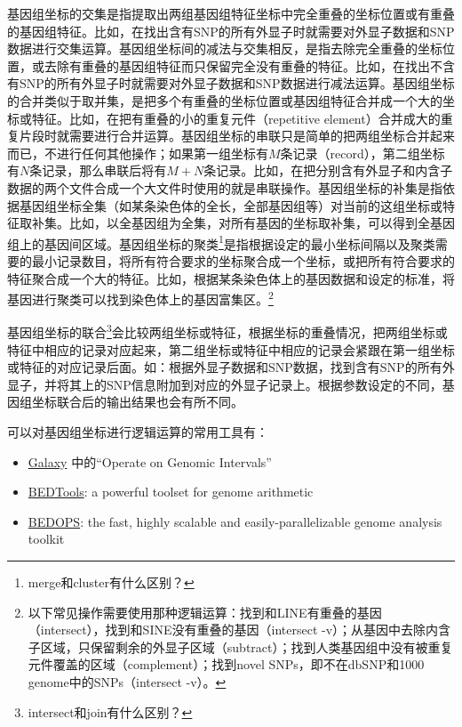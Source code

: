 \documentclass[11pt,a4paper,twoside]{book}
\begin{document}
基因组坐标的交集是指提取出两组基因组特征坐标中完全重叠的坐标位置或有重叠的基因组特征。比如，在找出含有SNP的所有外显子时就需要对外显子数据和SNP数据进行交集运算。基因组坐标间的减法与交集相反，是指去除完全重叠的坐标位置，或去除有重叠的基因组特征而只保留完全没有重叠的特征。比如，在找出不含有SNP的所有外显子时就需要对外显子数据和SNP数据进行减法运算。基因组坐标的合并类似于取并集，是把多个有重叠的坐标位置或基因组特征合并成一个大的坐标或特征。比如，在把有重叠的小的重复元件（repetitive element）合并成大的重复片段时就需要进行合并运算。基因组坐标的串联只是简单的把两组坐标合并起来而已，不进行任何其他操作；如果第一组坐标有$M$条记录（record），第二组坐标有$N$条记录，那么串联后将有$M+N$条记录。比如，在把分别含有外显子和内含子数据的两个文件合成一个大文件时使用的就是串联操作。基因组坐标的补集是指依据基因组坐标全集（如某条染色体的全长，全部基因组等）对当前的这组坐标或特征取补集。比如，以全基因组为全集，对所有基因的坐标取补集，可以得到全基因组上的基因间区域。基因组坐标的聚类\footnote{merge和cluster有什么区别？}是指根据设定的最小坐标间隔以及聚类需要的最小记录数目，将所有符合要求的坐标聚合成一个坐标，或把所有符合要求的特征聚合成一个大的特征。比如，根据某条染色体上的基因数据和设定的标准，将基因进行聚类可以找到染色体上的基因富集区。\footnote{以下常见操作需要使用那种逻辑运算：找到和LINE有重叠的基因（intersect），找到和SINE没有重叠的基因（intersect -v）；从基因中去除内含子区域，只保留剩余的外显子区域（subtract）；找到人类基因组中没有被重复元件覆盖的区域（complement）；找到novel SNPs，即不在dbSNP和1000 genome中的SNPs（intersect -v）。}

基因组坐标的联合\footnote{intersect和join有什么区别？}会比较两组坐标或特征，根据坐标的重叠情况，把两组坐标或特征中相应的记录对应起来，第二组坐标或特征中相应的记录会紧跟在第一组坐标或特征的对应记录后面。如：根据外显子数据和SNP数据，找到含有SNP的所有外显子，并将其上的SNP信息附加到对应的外显子记录上。根据参数设定的不同，基因组坐标联合后的输出结果也会有所不同。

可以对基因组坐标进行逻辑运算的常用工具有：
\begin{itemize}
  \item \href{https://usegalaxy.org/}{Galaxy} 中的“Operate on Genomic Intervals”
  \item \href{http://bedtools.readthedocs.org/en/latest/}{BEDTools}: a powerful toolset for genome arithmetic
  \item \href{https://bedops.readthedocs.org/en/latest/}{BEDOPS}: the fast, highly scalable and easily-parallelizable genome analysis toolkit
\end{itemize}
\end{document}
